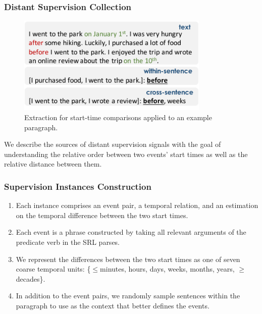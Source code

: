 \documentclass[10pt,aspectratio=43]{beamer}
\begin{document}
	\begin{frame}
	    \frametitle{\textbf{Distant Supervision Collection}}
	    \begin{figure}
	        \centering
	        \includegraphics[width=3.6in]{figures/fig-extraction-short.pdf}
	        \caption{Extraction for start-time comparisons applied to an example paragraph.}
            \label{fig:extraction-example}
	    \end{figure}
	    We describe the sources of distant supervision signals with the goal of understanding the relative order between two events’ start times as well as the relative distance between them.
	\end{frame}

	\begin{frame}
	    \frametitle{\textbf{Supervision Instances Construction}}
	    \begin{enumerate}
	        \item Each instance comprises an event pair, a temporal relation, and an estimation on the temporal difference between the two start times.
	        \item Each event is a phrase constructed by taking all relevant arguments of the predicate verb in the SRL parses.
	        \item We represent the differences between the two start times as one of seven coarse temporal units: \{$\leq$minutes, hours, days, weeks, months, years, $\geq$decades\}.
	        \item In addition to the event pairs, we randomly sample sentences within the paragraph to use as the context that better defines the events.
	    \end{enumerate}
	\end{frame}
\end{document}
